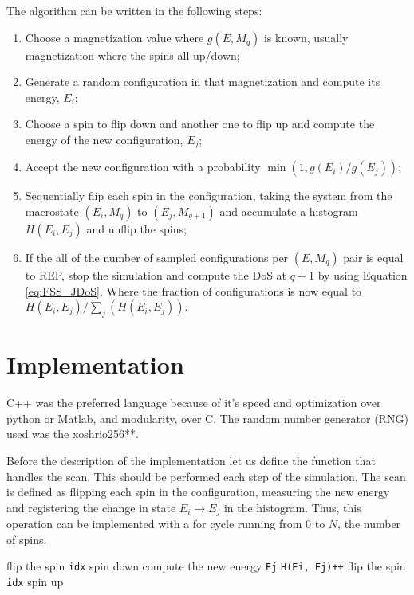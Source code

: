 The algorithm can be written in the following steps:
\begin{enumerate}
\item Choose a magnetization value where $g(E, M_q)$ is known, usually magnetization where the spins all up/down;
\item Generate a random configuration in that magnetization and compute its energy, $E_i$;                                                                                                                                       
\item Choose a spin to flip down and another one to flip up and compute the energy of the new configuration, $E_j$;
\item Accept the new configuration with a probability $\min(1, g(E_i)/g(E_j))$;
\item Sequentially flip each spin in the configuration, taking the system from the macrostate $(E_i, M_q)$ to $(E_j, M_{q+1})$ and accumulate a histogram $H(E_i, E_j)$ and unflip the spins;
\item If the all of the number of sampled configurations per $(E,M_{q})$ pair is equal to REP, stop the simulation and compute the DoS at $q+1$ by using Equation \ref{eq:FSS_JDoS}. Where the fraction of configurations is now equal to $H(E_i, E_j)/\sum_j(H(E_i,E_j))$.
\end{enumerate}

\section{Implementation}

	C++ was the preferred language because of it's speed and optimization over python or Matlab, and modularity, over C. The random number generator (RNG) used was the xoshrio256**.

	Before the description of the implementation let us define the function that handles the scan. This should be performed each step of the simulation. The scan is defined as flipping each spin in the configuration, measuring the new energy and registering the change in state $E_i \rightarrow E_j$ in the histogram. Thus, this operation can be implemented with a for cycle running from $0$ to $N$, the number of spins.
\begin{algorithm}
	\begin{algorithmic}[1]
			\State flip the spin \texttt{idx} spin down
			\State compute the new energy \texttt{Ej}
			\State \texttt{H(Ei, Ej)++}
			\State flip the spin \texttt{idx} spin up
		\EndFor
	\EndFunction
	\end{algorithmic} 
\end{algorithm} 

